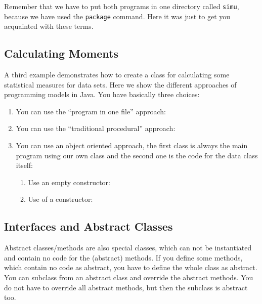 Remember that we have to put both programs in one directory called
\verb|simu|, because we have used the \verb|package| command. Here it
was just to get you acquainted with these terms.

\subsection{Calculating Moments}
A third example demonstrates how to create a class for calculating
some statistical measures for data sets. Here we show the
different approaches of programming models in Java. 
You have basically three choices:
\begin{enumerate}
\item You can use the ``program in one file'' approach: 

\item You can use the ``traditional procedural'' approach:


\item You can use an object oriented approach, the first class is always
  the main program using our own class and the second one is the
  code for the data class itself:
  \begin{enumerate}
  \item Use an empty constructor: 
    
    
  \item Use of a constructor:
    
    
  \end{enumerate}
\end{enumerate}

\subsection{Interfaces and Abstract Classes}
Abstract classes/methods 
are also special classes, which can not be instantiated
and contain no code for the (abstract) methods. If you define
some methods, which contain no code as abstract, you have to 
define the whole class as abstract. You can subclass from an 
abstract class and override the abstract methods. You do not have
to override all abstract methods, but then the subclass is abstract
too.

